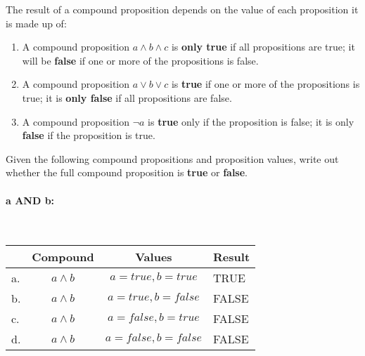 {\begin{introNOHEAD}{}
        The result of a compound proposition depends on the value of
        each proposition it is made up of:

        \begin{enumerate}
            \item A compound proposition $a \land b \land c$ is \textbf{only true}
                if all propositions are true; it will be \textbf{false} if
                one or more of the propositions is false.
            \item A compound proposition $a \lor b \lor c$ is \textbf{true}
                if one or more of the propositions is true; it is \textbf{only false}
                if all propositions are false.
            \item A compound proposition $\neg a$ is \textbf{true} only
                if the proposition is false; it is only \textbf{false} if
                the proposition is true.
        \end{enumerate}

    \end{introNOHEAD}

    \newpage

    \begin{questionNOGRADE}{\thequestion}
        Given the following compound propositions and proposition values,
        write out whether the full compound proposition is \textbf{true} or \textbf{false}.
    \end{questionNOGRADE}

        \paragraph{a AND b:} ~\\

        \begin{tabular}{ | l  c | c | p{6cm} | }
            \hline
            & \textbf{Compound} & \textbf{Values} & \textbf{Result}
            \\ \hline

            a. &        $a \land b$ &       $a = true, b = true$ &       TRUE   \\ \hline
            b. &        $a \land b$ &       $a = true, b = false$ &       FALSE   \\ \hline
            c. &        $a \land b$ &       $a = false, b = true$ &       FALSE   \\ \hline
            d. &        $a \land b$ &       $a = false, b = false$ &       FALSE   \\ \hline
        \end{tabular}

}
